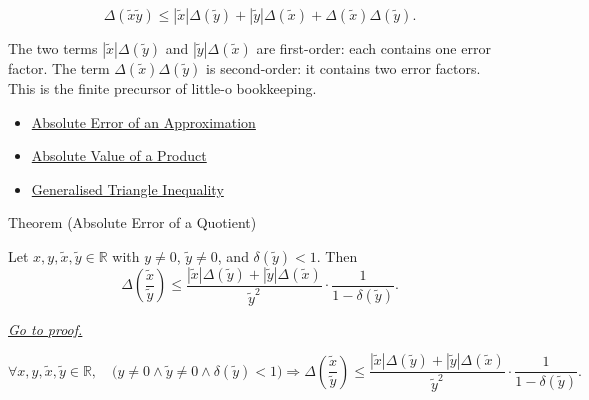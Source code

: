 \begin{remark*}
\[
\Delta(\widetilde{x}\widetilde{y})\leq |\widetilde{x}|\Delta(\widetilde{y})+|\widetilde{y}|\Delta(\widetilde{x})+\Delta(\widetilde{x})\Delta(\widetilde{y}).
\]
\end{remark*}

\begin{remark*}[Interpretation]
The two terms
$|\widetilde{x}|\Delta(\widetilde{y})$ and
$|\widetilde{y}|\Delta(\widetilde{x})$ are first-order: each contains one
error factor. The term
$\Delta(\widetilde{x})\Delta(\widetilde{y})$ is second-order: it contains
two error factors. This is the finite precursor of little-o bookkeeping.
\end{remark*}

\begin{dependencies}
\begin{itemize}
  \item \hyperref[def:absolute-error-approximation]{Absolute Error of an Approximation}
  \item \hyperref[thm:absolute-value-product]{Absolute Value of a Product}
  \item \hyperref[thm:absolute-value-sum-bound]{Generalised Triangle Inequality}
\end{itemize}
\end{dependencies}

\begin{theorembox}{Theorem (Absolute Error of a Quotient)}
\begin{theorem}
\label{thm:absolute-error-quotient}
Let $x,y,\widetilde{x},\widetilde{y}\in\mathbb{R}$ with
$y\neq 0$, $\widetilde{y}\neq 0$, and
$\delta(\widetilde{y})<1$. Then
\[
  \Delta\!\left(\frac{\widetilde{x}}{\widetilde{y}}\right)
  \leq
  \frac{
    |\widetilde{x}|\Delta(\widetilde{y})
    +
    |\widetilde{y}|\Delta(\widetilde{x})
  }{\widetilde{y}^{2}}
  \cdot
  \frac{1}{1-\delta(\widetilde{y})}.
\]

\smallskip\noindent
\hyperref[prf:absolute-error-quotient]{\textit{Go to proof.}}
\end{theorem}
\end{theorembox}

\begin{remark*}
\[
\forall x,y,\widetilde{x},\widetilde{y}\in\mathbb{R},\quad
\bigl(y\ne0\land \widetilde{y}\ne0\land \delta(\widetilde{y})<1\bigr)
\Rightarrow
\Delta\!\left(\frac{\widetilde{x}}{\widetilde{y}}\right)
\leq
\frac{|\widetilde{x}|\Delta(\widetilde{y})+|\widetilde{y}|\Delta(\widetilde{x})}{\widetilde{y}^{2}}
\cdot\frac{1}{1-\delta(\widetilde{y})}.
\]
\end{remark*}

